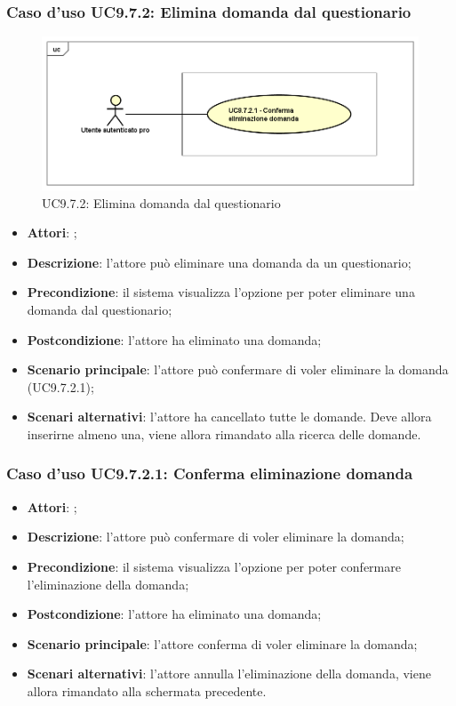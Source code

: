 		 \subsubsection{Caso d'uso UC9.7.2: Elimina domanda dal questionario}
		 \label{UC9.7.2}
		 \begin{figure}[h]
		 	\centering
		 	\includegraphics[scale=0.5,keepaspectratio]{UML/UC9_7_2.png}
		 	\caption{UC9.7.2: Elimina domanda dal questionario}
		 \end{figure}
		 \FloatBarrier
		 \begin{itemize}
		 	\item \textbf{Attori}: \uaupro{};
		 	\item \textbf{Descrizione}: l'attore può eliminare una domanda da un questionario;
		 	\item \textbf{Precondizione}: il sistema visualizza l'opzione per poter eliminare una domanda dal questionario;
		 	\item \textbf{Postcondizione}: l'attore ha eliminato una domanda;
		 	\item \textbf{Scenario principale}: l'attore può confermare di voler eliminare la domanda (UC9.7.2.1); 
		 	\item \textbf{Scenari alternativi}: l'attore ha cancellato tutte le domande. Deve allora inserirne almeno una, viene allora rimandato alla ricerca delle domande.
		 \end{itemize}
		 
		 \subsubsection{Caso d'uso UC9.7.2.1: Conferma eliminazione domanda}
		 \label{UC9.7.2.1}
		 \begin{itemize}
		 	\item \textbf{Attori}: \uaupro{};
		 	\item \textbf{Descrizione}: l'attore può confermare di voler eliminare la domanda;
		 	\item \textbf{Precondizione}: il sistema visualizza l'opzione per poter confermare l'eliminazione della domanda;
		 	\item \textbf{Postcondizione}: l'attore ha eliminato una domanda;
		 	\item \textbf{Scenario principale}: l'attore conferma di voler eliminare la domanda;
		 	\item \textbf{Scenari alternativi}: l'attore annulla l'eliminazione della domanda, viene allora rimandato alla schermata precedente.
		 \end{itemize}
		 
